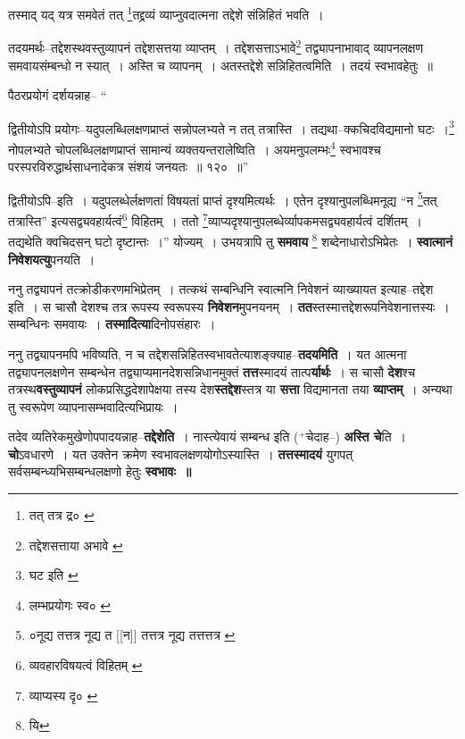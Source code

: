 \documentclass[article,12pt,a4paper]{memoir}
\newcommand{\add}[1]{($^{+}$#1)}
\begin{document}
	तस्माद् यद् यत्र समवेतं तत् \footnote{तत् तत्र द्र० \cite{dp-edE}}\-तद्द्रव्यं व्याप्नुवदात्मना तद्देशे संन्निहितं भवति । 
	  
	तदयमर्थः--तद्देशस्थवस्तुव्यापनं तद्देशसत्तया व्याप्तम् । तद्देशसत्ताऽभावे\footnote{तद्देशसत्ताया अभावे \cite{dp-msB} \cite{dp-msC}} तद्व्यापनाभावाद् व्यापनलक्षण समवायसंम्बन्धो न स्यात् । अस्ति च व्यापनम् । अतस्तद्देशे सन्निहितत्वमिति । तदयं स्वभावहेतुः ॥ 
	  
	पैठरप्रयोगं दर्शयन्नाह-- “
	  
	द्वितीयोऽपि प्रयोगः--यदुपलब्धिलक्षणप्राप्तं सन्नोपलभ्यते न तत् तत्रास्ति । तद्यथा--क्कचिदविद्यमानो घटः ।\footnote{घट इति \cite{dp-msC}} नोपलभ्यते चोपलब्धिलक्षणप्राप्तं सामान्यं व्यक्तयन्तरालेष्विति । अयमनुपलम्भः\footnote{लम्भप्रयोगः स्व० \cite{dp-msD} \cite{dp-msB} \cite{dp-edP} \cite{dp-edH} \cite{dp-edE} \cite{dp-edN}} स्वभावश्च परस्परविरुद्धार्थसाधनादेकत्र संशयं जनयतः ॥ १२० ॥” 
	  
	द्वितीयोऽपि--इति । यदुपलब्धेर्लक्षणतां विषयतां प्राप्तं दृश्यमित्यर्थः । एतेन दृश्यानुपलब्धिमनूद्य “न \footnote{०नूद्य तत्तत्र \cite{dp-msB} नूद्य त [[न]] तत्तत्र \cite{dp-msA} नूद्य तत्तत्तत्र \cite{dp-edP} \cite{dp-edH}}\-तत् तत्रास्ति” इत्यसद्व्यवहार्यत्वं\footnote{व्यवहारविषयत्वं विहितम् \cite{dp-msD}} विहितम् । ततो \footnote{व्याप्यस्य दृ० \cite{dp-edE}}\-व्याप्यदृश्यानुपलब्धेर्व्यापकमसद्व्यवहार्यत्वं दर्शितम् । तद्यथेति क्वचिदसन् घटो दृष्टान्तः ।” योज्यम् । उभयत्रापि तु \textbf{समवाय} \footnote{यि} शब्देनाधारोऽभिप्रेतः । \textbf{स्वात्मानं निवेशयत्यु}पनयति ।
	\pend
      

	  \pstart ननु तद्व्यापनं तत्क्रोडीकरणमभिप्रेतम् । तत्कथं सम्बन्धिनि स्वात्मनि निवेशनं व्याख्यायत इत्याह--तद्देश इति । स चासौ देशश्च तत्र रूपस्य स्वरूपस्य \textbf{निवेशन}मुपनयनम् । \textbf{तत}स्तस्मात्तद्देशरूपनिवेशनात्तस्यः । सम्बन्धिनः समवायः । \textbf{तस्मादित्या}दिनोपसंहारः ।
	\pend
      

	  \pstart ननु तद्व्यापनमपि भविष्यति, न च तद्देशसन्निहितस्वभावतेत्याशङ्क्याह--\textbf{तदयमिति} । यत आत्मना तद्व्यापनलक्षणेन सम्बन्धेन तद्व्याप्यमानदेशसन्निधानमुक्तं \textbf{तत्त}स्मादयं तात्प\textbf{र्यार्थः} । स चासौ \textbf{देश}श्च तत्रस्थ\textbf{वस्तुव्यापनं} लोकप्रसिद्धदेशापेक्षया तस्य देश\textbf{स्तद्देश}स्तत्र या \textbf{सत्ता} विद्यमानता तया \textbf{व्याप्तम्} । अन्यथा तु स्वरूपेण व्यापनासम्भवादित्यभिप्रायः ।
	\pend
      

	  \pstart तदेव व्यतिरेकमुखेणोपपादयन्ना\leavevmode{}ह--\textbf{तद्देशेति} । नास्त्येवायं सम्बन्ध इति \add{चेदाह--} \textbf{अस्ति चे}ति । \textbf{चो}ऽवधारणे । यत उक्तेन क्रमेण स्वभावलक्षणयोगोऽस्यास्ति । \textbf{तत्तस्मादयं} युगपत् सर्वसम्बन्ध्यभिसम्बन्धलक्षणो हेतुः \textbf{स्वभावः ॥}
	\pend
	  \bigskip
	  \begingroup
	
\end{document}
